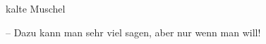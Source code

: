 



\pageref{lS44-1}
\begin{it}kalte Muschel\end{it} -- Dazu kann man sehr viel sagen, aber nur wenn
man will!
